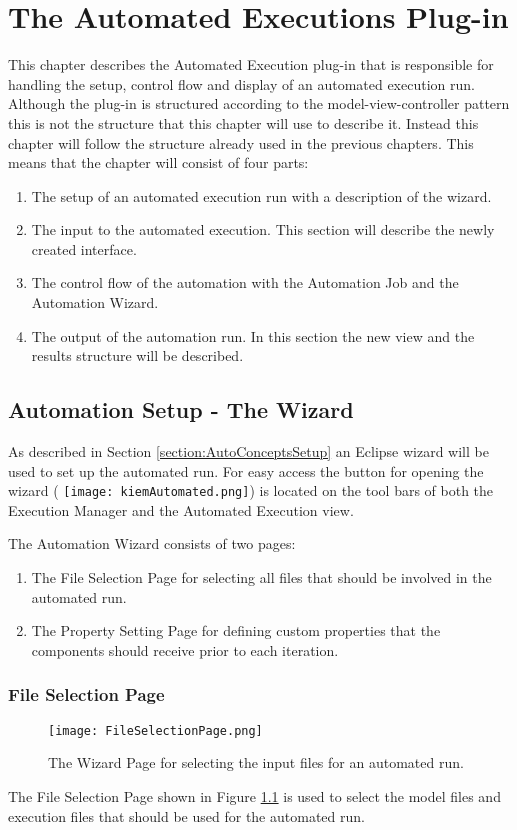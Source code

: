 \chapter{The Automated Executions Plug-in}
This chapter describes the Automated Execution plug-in that is responsible for handling
the setup, control flow and display of an automated execution run.
Although the plug-in is structured according to the model-view-controller pattern this
is not the structure that this chapter will use to describe it. Instead this chapter will
follow the structure already used in the previous chapters. This means that the chapter will
consist of four parts:
\begin{enumerate}
 \item The setup of an automated execution run with a description of the wizard.
 \item The input to the automated execution. This section will describe the newly created interface.
 \item The control flow of the automation with the Automation Job and the Automation Wizard.
 \item The output of the automation run. In this section the new view and the results structure will
be described.
\end{enumerate}


\section{Automation Setup - The Wizard}
\label{section:AutoWizard}
As described in Section \ref{section:AutoConceptsSetup} an Eclipse wizard will be used to set up the 
automated run. For easy access the button for opening the wizard (
\texttt{[image: kiemAutomated.png]})
is located on the tool bars of both the Execution Manager and the Automated Execution view.

The Automation Wizard consists of two pages:
\begin{enumerate}
 \item The File Selection Page for selecting all files that should be involved in the automated run.
 \item The Property Setting Page for defining custom properties that the components should receive prior to
each iteration.
\end{enumerate}


\subsection{File Selection Page}
\label{section:FileSelectionPage}
\begin{figure}
  \centering
  \texttt{[image: FileSelectionPage.png]}
  \caption[The Wizard Page for selecting the input files for an automated run.]%
  {The Wizard Page for selecting the input files for an automated run.\protect}
  \label{fig:FileSelectionPage}
\end{figure}
The File Selection Page shown in Figure \ref{fig:FileSelectionPage} is used to select the model 
files and execution files that should be used for the automated run.

